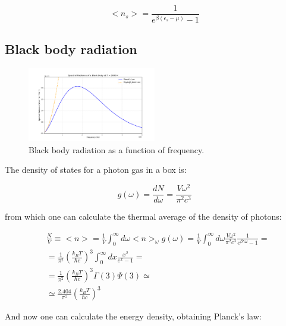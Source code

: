 \documentclass{article}
\begin{document}
\begin{equation}
    <n_s>=\frac{1}{e^{\beta(\epsilon_s-\mu)}-1}
\end{equation}


\subsection{Black body radiation}

\begin{figure}[h]
    \centering
    \includegraphics[width=0.5\textwidth]{images/black-body.png}
    \caption{Black body radiation as a function of frequency.}
    \label{fig:black-body-radiation}
\end{figure}
The density of states for a photon gas in a box is:

\begin{equation}
    g(\omega)=\frac{d N}{d\omega}=\frac{V\omega^2}{\pi^2c^3}
\end{equation}

from which one can calculate the thermal average of the density of photons:

\begin{equation}
    \begin{aligned}
         & \frac{N}{V}\equiv<n>=\frac{1}{V}\int_0^\infty d\omega <n>_\omega g(\omega)=\frac{1}{V}\int_0^\infty d\omega \frac{V\omega^2}{\pi^2c^3}\frac{1}{e^{\beta\hbar\omega}-1}= \\
         & =\frac{1}{\pi^2}\left(\frac{k_B T}{\hbar c}\right)^3\int_0^\infty dx \frac{x^2}{e^x-1}=                                                                                 \\
         & = \frac{1}{\pi^2}\left(\frac{k_B T}{\hbar c}\right)^3 \Gamma(3)\Psi(3)\simeq                                                                                            \\
         & \simeq \frac{2.404}{\pi^2}\left(\frac{k_B T}{\hbar c}\right)^3
    \end{aligned}
\end{equation}

And now one can calculate the energy density, obtaining Planck's law:
\end{document}
